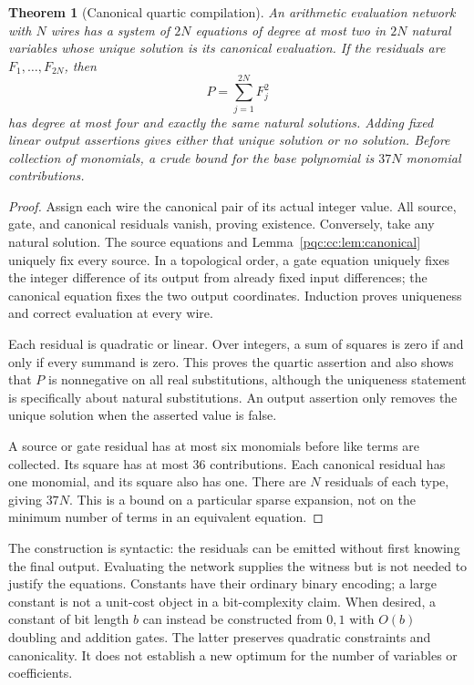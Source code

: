 \documentclass[11pt,letterpaper]{article}
\numberwithin{equation}{section}
\newtheorem{theorem}{Theorem}[section]
\theoremstyle{definition}
\theoremstyle{remark}
\begin{document}
\begin{theorem}[Canonical quartic compilation]
\label{pqc:cc:thm:wires}
An arithmetic evaluation network with $N$ wires has a system of $2N$ equations
of degree at most two in $2N$ natural variables whose unique solution is its
canonical evaluation. If the residuals are $F_1,\ldots,F_{2N}$, then
\begin{equation}
 P=\sum_{j=1}^{2N}F_j^2
\label{pqc:cc:eq:sumsquares}
\end{equation}
has degree at most four and exactly the same natural solutions. Adding fixed
linear output assertions gives either that unique solution or no solution.
Before collection of monomials, a crude bound for the base polynomial is $37N$
monomial contributions.
\end{theorem}
\begin{proof}
Assign each wire the canonical pair of its actual integer value. All source,
gate, and canonical residuals vanish, proving existence. Conversely, take any
natural solution. The source equations and Lemma~\ref{pqc:cc:lem:canonical} uniquely
fix every source. In a topological order, a gate equation uniquely fixes the
integer difference of its output from already fixed input differences; the
canonical equation fixes the two output coordinates. Induction proves
uniqueness and correct evaluation at every wire.

Each residual is quadratic or linear. Over integers, a sum of squares is zero
if and only if every summand is zero. This proves the quartic assertion and
also shows that $P$ is nonnegative on all real substitutions, although the
uniqueness statement is specifically about natural substitutions. An output
assertion only removes the unique solution when the asserted value is false.

A source or gate residual has at most six monomials before like terms are
collected. Its square has at most 36 contributions. Each canonical residual
has one monomial, and its square also has one. There are $N$ residuals of each
type, giving $37N$. This is a bound on a particular sparse expansion, not on
the minimum number of terms in an equivalent equation.
\end{proof}

The construction is syntactic: the residuals can be emitted without first
knowing the final output. Evaluating the network supplies the witness but is
not needed to justify the equations. Constants have their ordinary binary
encoding; a large constant is not a unit-cost object in a bit-complexity claim.
When desired, a constant of bit length $b$ can instead be constructed from
$0,1$ with $O(b)$ doubling and addition gates. The latter preserves quadratic
constraints and canonicality. It does not establish a new optimum for the
number of variables or coefficients.
\end{document}
